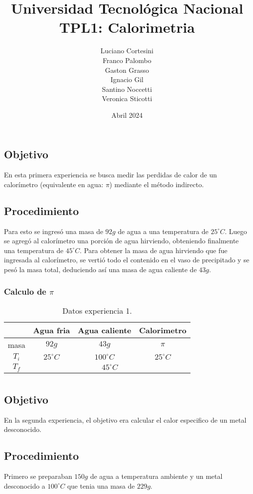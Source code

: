 \documentclass[12pt]{report}
\title{Universidad Tecnológica Nacional\\TPL1: Calorimetria}
\author{
Luciano Cortesini\\
Franco Palombo\\
Gaston Grasso\\
Ignacio Gil\\
Santino Noccetti\\
Veronica Sticotti
}
\date{Abril 2024}
\begin{document}
\maketitle

\chapter{}
\section{Objetivo}
En esta primera experiencia se busca medir las perdidas de calor de un calorímetro (equivalente en agua: $\pi$) mediante el método indirecto. 

\section{Procedimiento}
Para esto se ingresó una masa de $92 g$ de agua a una temperatura de $25^\circ C$.
Luego se agregó al calorímetro una porción de agua hirviendo, obteniendo finalmente una temperatura de  $45^\circ C$. 
Para obtener la masa de agua hirviendo que fue ingresada al calorímetro, se vertió todo el contenido en el vaso de precipitado y se pesó la masa total, deduciendo así una masa de agua caliente de $43g$.
\subsection{Calculo de $\pi$}
\begin{table}[htbp]
    \centering
    \begin{tabular}{|c|c|c|c|}
    \hline
    & Agua fria & Agua caliente & Calorimetro\\
    \hline
    masa & $92g$ & $43g$ & $\pi$ \\
    \hline
   $T_i$ & $25^\circ C$ & $100^\circ C$ & $25^\circ C$\\
    \hline
     $T_f$ & \multicolumn{3}{|c|}{$45^\circ C$}\\
    \hline
    \end{tabular}
    \caption{Datos experiencia 1.}
    \label{tab:datos experiencia 1}
\end{table}

\chapter{}
\section{Objetivo}
En la segunda experiencia, el objetivo era calcular el calor especifico de un metal desconocido.

\section{Procedimiento}
Primero se preparaban $150 g$ de agua a temperatura ambiente y un metal desconocido a $100^\circ C$ que tenia una masa de $229 g$.
\end{document}

